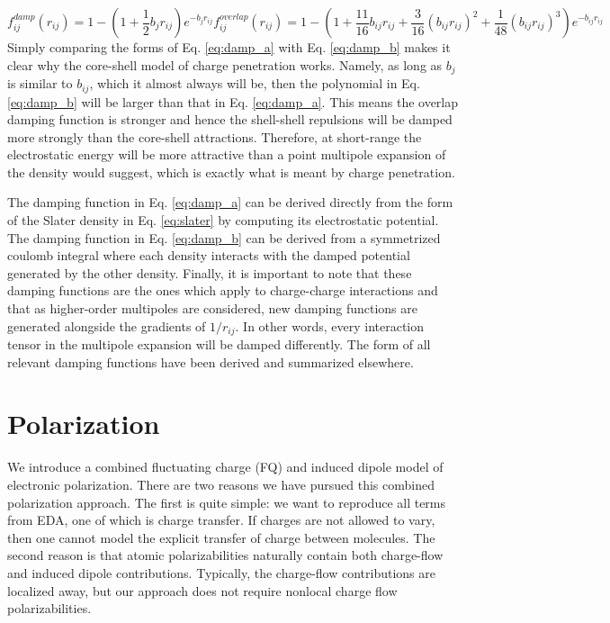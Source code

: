 \documentclass[journal=jacsat,manuscript=article]{achemso}
\begin{document}
\begin{subequations}
  \begin{equation}
    f_{ij}^{damp}(r_{ij})=1-\left(1+\frac12b_{j}r_{ij}\right)e^{-b_{j}r_{ij}}
    \label{eq:damp_a}
  \end{equation}
  \begin{equation}
    f_{ij}^{overlap}(r_{ij})=1-\left(1+\frac{11}{16}b_{ij}r_{ij}+\frac{3}{16}(b_{ij}r_{ij})^2+\frac{1}{48}(b_{ij}r_{ij})^3\right)e^{-b_{ij}r_{ij}} 
    \label{eq:damp_b}
  \end{equation}
\end{subequations}
\noindent
Simply comparing the forms of Eq. \ref{eq:damp_a} with Eq. \ref{eq:damp_b} makes it clear
why the core-shell model of charge penetration works. Namely, as long as $b_j$ is similar
to $b_{ij}$, which it almost always will be, then the polynomial in Eq. \ref{eq:damp_b} will
be larger than that in Eq. \ref{eq:damp_a}. This means the overlap damping function is stronger
and hence the shell-shell repulsions will be damped more strongly than the core-shell
attractions. Therefore, at short-range the electrostatic energy will be more attractive than a
point multipole expansion of the density would suggest, which is exactly what is meant by
charge penetration.

The damping function in Eq. \ref{eq:damp_a} can be derived directly from the form
of the Slater density in Eq. \ref{eq:slater} by computing its electrostatic potential.
The damping function in Eq. \ref{eq:damp_b} can be derived from a symmetrized coulomb integral where each
density interacts with the damped potential generated by the other density.\cite{rackers2021polarizable}
Finally, it is important to note that these damping functions are the ones which apply
to charge-charge interactions and that as higher-order multipoles are considered, new damping
functions are generated alongside the gradients of $1/r_{ij}$. In other words, every interaction
tensor in the multipole expansion will be damped differently. The form of all relevant damping
functions have been derived and summarized elsewhere.\cite{rackers2021polarizable}

\section*{Polarization}

We introduce a combined fluctuating charge (FQ) and induced dipole model of electronic
polarization. There are two reasons we have pursued this combined polarization
approach. The first is quite simple: we want to reproduce all terms from EDA,
one of which is charge transfer. If charges are not allowed to vary, then one
cannot model the explicit transfer of charge between molecules. The second reason is
that atomic polarizabilities naturally contain both charge-flow and induced dipole
contributions.\cite{stone1985distributedb} Typically, the charge-flow contributions
are localized away\cite{ruth1994localization}, but our approach does not require nonlocal
charge flow polarizabilities.
\end{document}
